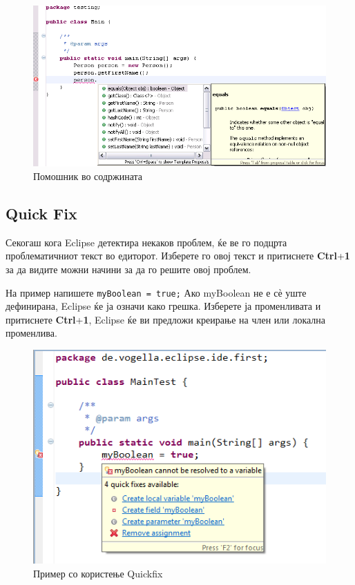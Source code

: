 \begin{figure}
\centering
\includegraphics[scale=.5]{images/autocomplete}
\caption{Помошник во содржината}
\end{figure}

\subsection{Quick Fix}

Секогаш кога Eclipse детектира некаков проблем, ќе ве го подцрта проблематичниот
текст во едиторот. Изберете го овој текст и притиснете \textbf{Ctrl}+\textbf{1}
за да видите можни начини за да го решите овој проблем.

На пример напишете \texttt{myBoolean = true;} Ако myBoolean не е сѐ уште
дефинирана, Eclipse ќе ја означи како грешка. Изберете ја променливата и
притиснете \textbf{Ctrl}+\textbf{1}, Eclipse ќе ви предложи креирање на член или
локална променлива.

\begin{figure}
\centering
\includegraphics[scale=.5]{images/quick-fix}
\caption{Пример со користење Quickfix}
\end{figure}

